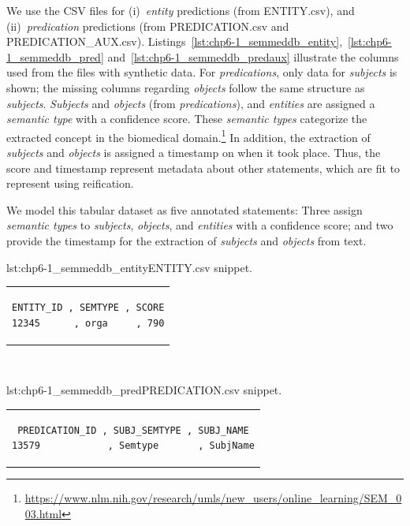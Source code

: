 We use the CSV files for (i)~\textit{entity} predictions (from ENTITY.csv), and (ii)~\textit{predication} predictions (from PREDICATION.csv and PREDICATION\_AU\-X.csv). Listings~\ref{lst:chp6-1_semmeddb_entity},~\ref{lst:chp6-1_semmeddb_pred} and~\ref{lst:chp6-1_semmeddb_predaux} illustrate the columns used from the files with synthetic data.
For \textit{predications}, only data for \textit{subjects} is shown; the missing columns regarding \textit{objects} follow the same structure as \textit{subjects}.
\textit{Subjects} and \textit{objects} (from \textit{predications}), and \textit{entities} are assigned a \textit{semantic type} with a confidence score.
These \textit{semantic types} categorize the extracted concept in the biomedical domain.\footnote{\url{https://www.nlm.nih.gov/research/umls/new\_users/online\_learning/SEM\_003.html}}
In addition, the extraction of \textit{subjects} and \textit{objects} is assigned a timestamp on when it took place. 
Thus, the score and timestamp represent metadata about other statements, which are fit to represent using reification.

We model this tabular dataset as five annotated statements: 
Three assign \textit{semantic types} to \textit{subjects}, \textit{objects}, and \textit{entities} with a confidence score; and two provide the timestamp for the extraction of \textit{subjects} and \textit{objects} from text.  


\noindent\begin{minipage}{0.42\linewidth}
\begin{captionedlisting}{lst:chp6-1_semmeddb_entity}{ENTITY.csv snippet.}
\centering
\begin{tabular}{c}
\hspace{-0.7em}
{
\begin{lstlisting}[basicstyle=\ttfamily\small,label={lst:chp6-1_semmeddb_entity},columns=flexible]
ENTITY_ID , SEMTYPE , SCORE
12345      , orga     , 790
\end{lstlisting}
}
\end{tabular}
\end{captionedlisting}
\end{minipage}
\,\,\,\,\hfill
\begin{minipage}{0.58\linewidth}
\begin{captionedlisting}{lst:chp6-1_semmeddb_pred}{PREDICATION.csv snippet.}
\centering
\begin{tabular}{c}
\hspace{-1em}
{
\begin{lstlisting}[basicstyle=\ttfamily\small,label={lst:chp6-1_semmeddb_pred},columns=flexible]
PREDICATION_ID , SUBJ_SEMTYPE , SUBJ_NAME
13579            , Semtype       , SubjName
\end{lstlisting}
}
\end{tabular}
\end{captionedlisting}
\end{minipage}

